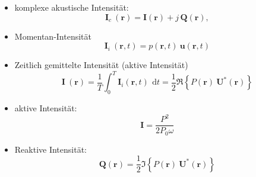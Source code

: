 \begin{itemize}
	\item komplexe akustische Intensität: \\
	\begin{equation}
	\mathbf{I}_c ~(\mathbf{r}) = \mathbf{I}(\mathbf{r}) + j\,\mathbf{Q}(\mathbf{r}),
	\label{helmholtz:equationIntensitaetComplex}
	\end{equation}	
	
	\item Momentan-Intensität \\
	\begin{equation}
	\mathbf{I}_i ~(\mathbf{r},t) = p(\mathbf{r},t)~\mathbf{u}(\mathbf{r},t)
	\label{helmholtz:equationIntensitaetMomentan}
	\end{equation}
			
	\item Zeitlich gemittelte Intensität (aktive Intensität) \\
	\begin{equation}
	\mathbf{I}~(\mathbf{r}) = \frac{1}{T}\int_0^T \mathbf{I}_i(\mathbf{r},t)\,~\mathrm{d}t = \frac{1}{2}\Re\left\{P(\mathbf{r})~\mathbf{U}^*(\mathbf{r})\right\}
	\end{equation}
	
	\item aktive Intensität: \\
	\begin{equation}
	\mathbf{I} = \frac{P^2}{2P_0\omega}
	\label{helmholtz:equationAktiveIntensitaet}
	\end{equation}
	
	\item Reaktive Intensität: \\
	\begin{equation}
	\mathbf{Q}(\mathbf{r}) = \frac{1}{2}\Im\left\{P(\mathbf{r})~\mathbf{U}^*(\mathbf{r})\right\}
	\label{helmholtz:equationReaktiveIntensitaet}
	\end{equation}
	
\end{itemize}
